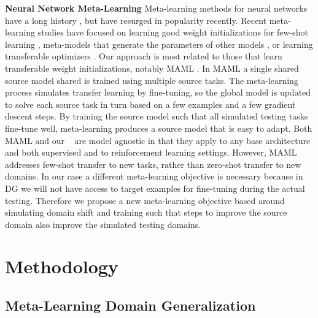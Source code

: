 \documentclass[letterpaper]{article} \usepackage{aaai18}  \usepackage{times}  \usepackage{helvet}  \usepackage{courier}  \usepackage{url}  \usepackage{graphicx}  \usepackage{amsmath}
\newcommand{\name}[1]{MLDG}
\newcommand{\keypoint}[1]{\vspace{0.1cm}\noindent\textbf{#1}\quad}
\begin{document}
\keypoint{Neural Network Meta-Learning} Meta-learning methods for neural networks have a long history \cite{thrun1998learntolearn,schmidhuber1997inductiveBias}, but have resurged in popularity recently. 
Recent meta-learning studies have focused on learning good weight initializations for few-shot learning \cite{finn2017model,parisotto2016transferRL}, meta-models that generate the parameters of other models \cite{vinyals2016oneShot,da2017dg}, or learning transferable optimizers \cite{ravi2016optimization,andrychowicz2016learning}. Our approach is most related to those that learn transferable weight initializations, notably MAML \cite{finn2017model}. In MAML a single shared source model shared is trained using multiple source tasks. The meta-learning process simulates transfer learning by fine-tuning, so the global model is updated to solve each source task in turn based on a few examples and a few gradient descent steps. By training the source model such that all simulated testing tasks fine-tune well, meta-learning produces a source model that is easy to adapt. Both MAML and our \name ~ are model agnostic in that they apply to any base architecture and both supervised and to reinforcement learning settings. However, MAML addresses few-shot transfer to new tasks, rather than zero-shot transfer to new domains. In our case a different meta-learning objective is necessary because in DG we will not have access to target examples for fine-tuning during the actual testing. Therefore we propose a new meta-learning objective based around simulating domain shift and training such that steps to improve the source domain also improve the simulated testing domains.





\section{Methodology}

\subsection{Meta-Learning Domain Generalization}
\end{document}
